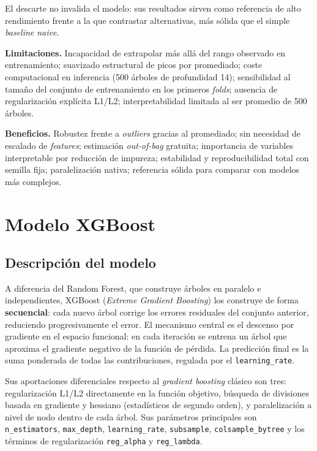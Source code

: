 \documentclass[11pt,a4paper]{article}
\begin{document}
El descarte no invalida el modelo: sus resultados sirven como referencia de alto rendimiento frente a la que contrastar alternativas, más sólida que el simple \textit{baseline naive}.

\textbf{Limitaciones.} Incapacidad de extrapolar más allá del rango observado en entrenamiento; suavizado estructural de picos por promediado; coste computacional en inferencia (500 árboles de profundidad 14); sensibilidad al tamaño del conjunto de entrenamiento en los primeros \textit{folds}; ausencia de regularización explícita L1/L2; interpretabilidad limitada al ser promedio de 500 árboles.

\textbf{Beneficios.} Robustez frente a \textit{outliers} gracias al promediado; sin necesidad de escalado de \textit{features}; estimación \textit{out-of-bag} gratuita; importancia de variables interpretable por reducción de impureza; estabilidad y reproducibilidad total con semilla fija; paralelización nativa; referencia sólida para comparar con modelos más complejos.

\section{Modelo XGBoost}

\subsection{Descripción del modelo}

A diferencia del Random Forest, que construye árboles en paralelo e independientes, XGBoost (\textit{Extreme Gradient Boosting}) los construye de forma \textbf{secuencial}: cada nuevo árbol corrige los errores residuales del conjunto anterior, reduciendo progresivamente el error. El mecanismo central es el descenso por gradiente en el espacio funcional: en cada iteración se entrena un árbol que aproxima el gradiente negativo de la función de pérdida. La predicción final es la suma ponderada de todas las contribuciones, regulada por el \texttt{learning\_rate}.

Sus aportaciones diferenciales respecto al \textit{gradient boosting} clásico son tres: regularización L1/L2 directamente en la función objetivo, búsqueda de divisiones basada en gradiente y hessiano (estadísticos de segundo orden), y paralelización a nivel de nodo dentro de cada árbol. Sus parámetros principales son \texttt{n\_estimators}, \texttt{max\_depth}, \texttt{learning\_rate}, \texttt{subsample}, \texttt{colsample\_bytree} y los términos de regularización \texttt{reg\_alpha} y \texttt{reg\_lambda}.
\end{document}
